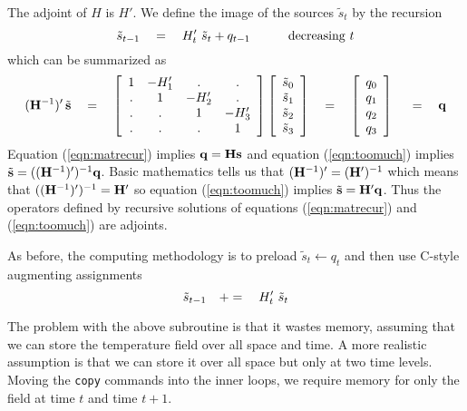 \par
The adjoint of $H$ is $H'$.
We define the image of the sources $\tilde s_t$ by the recursion
\begin{equation}
\tilde s_{t-1} \quad =\quad  H'_{t} \  \tilde s_{t} + q_{t-1}
				 \quad\quad\quad {\rm decreasing}\ t
\end{equation}
which can be summarized as
\begin{equation}
({\bold H}^{-1})'
\, \tilde {\bold s}  \eq
\left[
	\begin{array}{cccc}
		1         & -H'_1    &     .    &  .   \\
		.         & 1        &   -H'_2  &  .   \\
		.         &.         &     1    &-H'_3 \\
		.         & .        &.         &  1
	\end{array}
	\right]
\left[
	\begin{array}{c}
		\tilde s_0 \\
		\tilde s_1 \\
		\tilde s_2 \\
		\tilde s_3
		\end{array}
	\right]
\eq
\left[
	\begin{array}{c}
		q_0 \\
		q_1 \\
		q_2 \\
		q_3
		\end{array}
	\right] \ 
\eq \bold q
\label{eqn:toomuch}
\end{equation}
Equation (\ref{eqn:matrecur}) implies $\bold q=\bold H \bold s$
and equation (\ref{eqn:toomuch}) implies
$\tilde {\bold s} = ((\bold H^{-1})')^{-1}\bold q$.
Basic mathematics tells us that
$(\bold H^{-1})'=(\bold H')^{-1}$ which means that
$((\bold H^{-1})')^{-1}=\bold H'$
so equation (\ref{eqn:toomuch}) implies $\tilde {\bold s} = \bold H'\bold q$.
Thus the operators defined by recursive solutions
of equations (\ref{eqn:matrecur}) and (\ref{eqn:toomuch}) are adjoints.
\par
As before, the computing methodology is to preload
$\tilde s_{t}\leftarrow q_t$ and then use
C-style augmenting assignments
\begin{equation}
\tilde s_{t-1} \quad +=\quad  H'_{t} \  \tilde s_{t}
\end{equation}



The problem with the above subroutine is that
it wastes memory, assuming that we can store the temperature field
over all space and time.
A more realistic assumption is that we can store it over all space
but only at two time levels.
Moving the {\tt copy} commands into the inner loops,
we require memory for only the field at time $t$ and time $t+1$.

